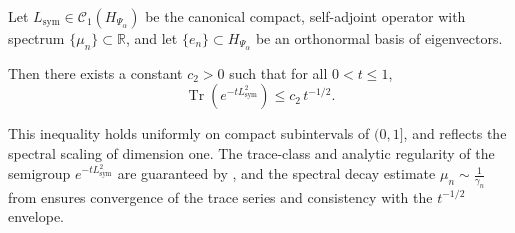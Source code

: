 \begin{lemma}
\label{lem:hk_upper_bound}
Let \( L_{\mathrm{sym}} \in \mathcal{C}_1(H_{\Psi_\alpha}) \) be the canonical compact, self-adjoint operator with spectrum \( \{ \mu_n \} \subset \mathbb{R} \), and let \( \{ e_n \} \subset H_{\Psi_\alpha} \) be an orthonormal basis of eigenvectors.

Then there exists a constant \( c_2 > 0 \) such that for all \( 0 < t \le 1 \),
\[
\operatorname{Tr}\left( e^{-t L_{\mathrm{sym}}^2} \right) \le c_2\, t^{-1/2}.
\]

\medskip
\noindent
This inequality holds uniformly on compact subintervals of \( (0,1] \), and reflects the spectral scaling of dimension one. The trace-class and analytic regularity of the semigroup \( e^{-t L_{\mathrm{sym}}^2} \) are guaranteed by , and the spectral decay estimate \( \mu_n \sim \frac{1}{\gamma_n} \) from  ensures convergence of the trace series and consistency with the \( t^{-1/2} \) envelope.
\end{lemma}
